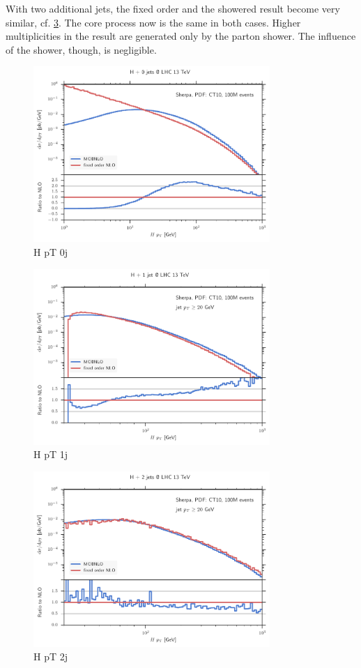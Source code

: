 With two additional jets, the fixed order and the showered result become very similar, cf. \cref{fig:hjj_hpt_nominal}.
The core process now is the same in both cases.
Higher multiplicities in the \mcatnlo{} result are generated only by the parton shower.
The influence of the shower, though, is negligible.
%
\begin{figure}
	\centering
	\includegraphics[width=0.8\textwidth]{images/h_hpt_nominal.pdf}
	\caption{H pT 0j}
	\label{fig:h_hpt_nominal}
\end{figure}
%
\begin{figure}
	\centering
	\includegraphics[width=0.8\textwidth]{images/hj_hpt_nominal.pdf}
	\caption{H pT 1j}
	\label{fig:hj_hpt_nominal}
\end{figure}
%
\begin{figure}
	\centering
	\includegraphics[width=0.8\textwidth]{images/hjj_hpt_nominal.pdf}
	\caption{H pT 2j}
	\label{fig:hjj_hpt_nominal}
\end{figure}
%
